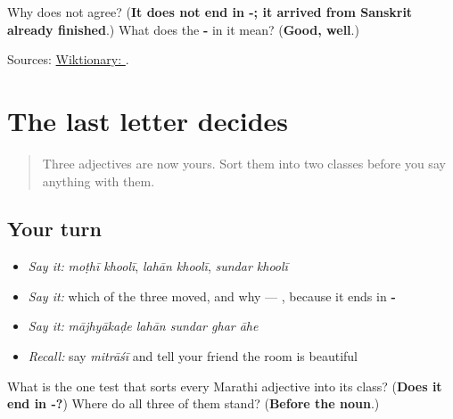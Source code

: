 \begin{tcolorbox}[breakable,colback=teal!4,colframe=teal!35!black,title={Before you move on}]
Why does \textbf{} not agree? (\textbf{It does not end in -; it arrived from Sanskrit already finished}.) What does the \textbf{-} in it mean? (\textbf{Good, well}.)

Sources: \href{https://en.wiktionary.org/wiki/\%E0\%A4\%B8\%E0\%A5\%81\%E0\%A4\%82\%E0\%A4\%A6\%E0\%A4\%B0}{Wiktionary: }.
\end{tcolorbox}
\section[\texorpdfstring{\mr{मोठा} · \mr{लहान} · \mr{सुंदर} (moṭhā · lahān …)}{मोठा · लहान · सुंदर (moṭhā · lahān …)}]{The last letter decides}

\label{lesson:MR-R50-small}



\begin{quote}
Three adjectives are now yours. Sort them into two classes before you say anything with them.
\end{quote}

\subsection*{Your turn}
\begin{itemize}
\raggedright
  \item \emph{Say it:} \emph{moṭhī khoolī}, \emph{lahān khoolī}, \emph{sundar khoolī}
  \item \emph{Say it:} which of the three moved, and why — \emph{\textbf{}}, because it ends in \textbf{-}
  \item \emph{Say it:} \emph{mājhyākaḍe lahān sundar ghar āhe}
  \item \emph{Recall:} say \emph{mitrāśī} and tell your friend the room is beautiful
\end{itemize}

\begin{tcolorbox}[breakable,colback=teal!4,colframe=teal!35!black,title={Before you move on}]
What is the one test that sorts every Marathi adjective into its class? (\textbf{Does it end in -?}) Where do all three of them stand? (\textbf{Before the noun}.)
\end{tcolorbox}
